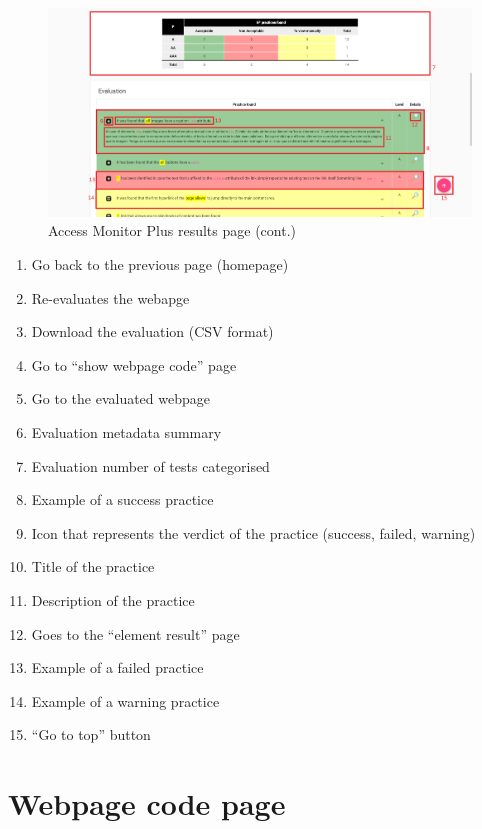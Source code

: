 \begin{figure}[H]
    \centering
    \includegraphics[width=\linewidth]{lib/images/amp/amp_results_page_2.png}
    \caption{Access Monitor Plus results page (cont.)}
    \label{fig:amp_results_page_2}
\end{figure}

\begin{enumerate}
    \item Go back to the previous page (homepage)
    \item Re-evaluates the webapge
    \item Download the evaluation (CSV format)
    \item Go to ``show webpage code'' page
    \item Go to the evaluated webpage
    \item Evaluation metadata summary
    \item Evaluation number of tests categorised
    \item Example of a success practice
    \item Icon that represents the verdict of the practice (success, failed, warning)
    \item Title of the practice
    \item Description of the practice
    \item Goes to the ``element result'' page
    \item Example of a failed practice
    \item Example of a warning practice
    \item ``Go to top'' button
\end{enumerate}

\clearpage

\section{Webpage code page}
\label{sec:amp_webpage_code_page}

